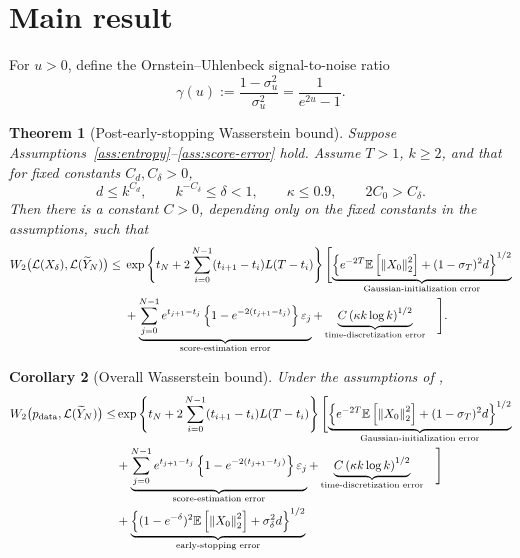 \documentclass[11pt]{article}
\newtheorem{theorem}{Theorem}[section]
\newtheorem{corollary}[theorem]{Corollary}
\theoremstyle{definition}
\newcommand{\E}{\mathbb{E}}
\newcommand{\Law}{\mathcal{L}}
\newcommand{\pdata}{p_{\mathrm{data}}}
\newcommand{\Wtwo}{W_2}
\newcommand{\norm}[1]{\left\lVert #1\right\rVert_2}
\begin{document}
\section{Main result}
\label{sec:main}

For $u>0$, define the Ornstein--Uhlenbeck signal-to-noise ratio
\begin{equation}
    \gamma(u):=\frac{1-\sigma_u^2}{\sigma_u^2}
    =\frac{1}{e^{2u}-1}.
    \label{eq:gamma}
\end{equation}

\begin{theorem}[Post-early-stopping Wasserstein bound]
\label{thm:main}
Suppose Assumptions~\ref{ass:entropy}--\ref{ass:score-error} hold. Assume $T>1$, $k\ge2$, and that for fixed constants $C_d,C_\delta>0$,
\begin{equation}
    d\le k^{C_d},
    \qquad
    k^{-C_\delta}\le\delta<1,
    \qquad
    \kappa\le0.9,
    \qquad
    2C_0>C_\delta.
    \label{eq:poly-regime}
\end{equation}
Then there is a constant $C>0$, depending only on the fixed constants in the assumptions, such that
\begin{align}
\Wtwo\bigl(\Law(X_\delta),\Law(\widetilde Y_N)\bigr)
\le{}&
\exp\left\{t_N+2\sum_{i=0}^{N-1}(t_{i+1}-t_i)L(T-t_i)\right\}
\Biggl[
\underbrace{\left\{e^{-2T}\E\left[\norm{X_0}^2\right]+(1-\sigma_T)^2d\right\}^{1/2}}_{\text{Gaussian-initialization error}}
\notag\\
&
+\underbrace{\sum_{j=0}^{N-1}e^{t_{j+1}-t_j}
\left\{1-e^{-2(t_{j+1}-t_j)}\right\}\varepsilon_j}_{\text{score-estimation error}}
+\underbrace{
 C\left(\kappa k\log k\right)^{1/2}
}_{\text{time-discretization error}}
\quad \Biggr].
\label{eq:post-early-stopping-bound}
\end{align}
\end{theorem}

\begin{corollary}[Overall Wasserstein bound]
\label{cor:overall-W2}
Under the assumptions of ,
\begin{align}
\Wtwo\bigl(\pdata,\Law(\widetilde Y_N)\bigr)
\le
&\exp\left\{t_N+2\sum_{i=0}^{N-1}(t_{i+1}-t_i)L(T-t_i)\right\}
\Biggl[
\underbrace{\left\{e^{-2T}\E\left[\norm{X_0}^2\right]+(1-\sigma_T)^2d\right\}^{1/2}}_{\text{Gaussian-initialization error}}
\notag\\
&
+\underbrace{\sum_{j=0}^{N-1}e^{t_{j+1}-t_j}
\left\{1-e^{-2(t_{j+1}-t_j)}\right\}\varepsilon_j}_{\text{score-estimation error}}
+\underbrace{
 C\left(\kappa k\log k\right)^{1/2}
}_{\text{time-discretization error}}
\quad \Biggr]\notag\\
&+\underbrace{\left\{(1-e^{-\delta})^2
\E\left[\norm{X_0}^2\right]+\sigma_\delta^2d\right\}^{1/2}
}_{\text{early-stopping error}}
\label{eq:overall-W2-bound}
\end{align}
\end{corollary}
\end{document}

